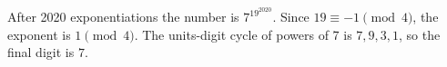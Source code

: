 After 2020 exponentiations the number is $7^{19^{2020}}$. Since $19\equiv-1\pmod4$, the exponent is $1\pmod4$. The units-digit cycle of powers of 7 is $7,9,3,1$, so the final digit is $\boxed7$.
